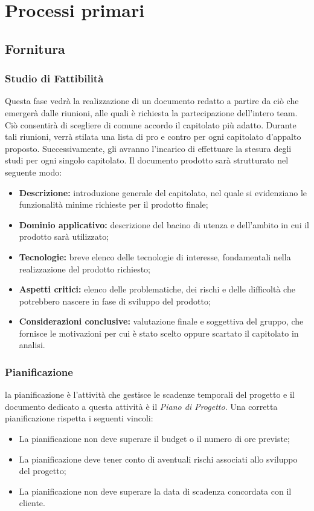 \newpage
\section{Processi primari}

	\subsection{Fornitura}
		\subsubsection{Studio di Fattibilità}
		Questa fase vedrà la realizzazione di un documento redatto a partire da ciò che emergerà dalle riunioni, alle quali è richiesta la partecipazione dell'intero team. Ciò consentirà di scegliere di comune accordo il capitolato più adatto. Durante tali riunioni, verrà stilata una lista di pro e contro per ogni capitolato d'appalto proposto. Successivamente, gli \textit{\Anas} avranno l'incarico di effettuare la stesura degli studi per ogni singolo capitolato. Il documento prodotto sarà strutturato nel seguente modo:
		\begin{itemize}
		\item \textbf{Descrizione:} introduzione generale del capitolato, nel quale si evidenziano le funzionalità minime richieste per il prodotto finale;
		\item \textbf{Dominio applicativo:} descrizione del bacino di utenza e dell'ambito in cui il prodotto sarà utilizzato;
		\item \textbf{Tecnologie:} breve elenco delle tecnologie di interesse, fondamentali nella realizzazione del prodotto richiesto;
		\item \textbf{Aspetti critici:} elenco delle problematiche, dei rischi e delle difficoltà che potrebbero nascere in fase di sviluppo del prodotto;
		\item \textbf{Considerazioni conclusive:} valutazione finale e soggettiva del gruppo, che fornisce le motivazioni per cui è stato scelto oppure scartato il capitolato in analisi.
		\end{itemize}
		
		\subsubsection{Pianificazione}
		la pianificazione è l'attività che gestisce le scadenze temporali del progetto e il documento dedicato a questa attività è il \textit{Piano di Progetto}. Una corretta pianificazione rispetta i seguenti vincoli:
		\begin{itemize}
			\item La pianificazione non deve superare il budget o il numero di ore previste;
			\item La pianificazione deve tener conto di aventuali rischi associati allo sviluppo del progetto;
			\item La pianificazione non deve superare la data di scadenza concordata con il cliente.
		\end{itemize}
	

